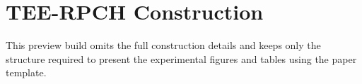 \section{TEE-RPCH Construction}
This preview build omits the full construction details and keeps only the structure required to present the experimental figures and tables using the paper template.
